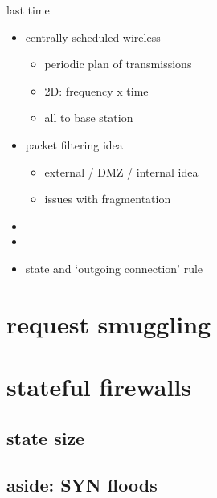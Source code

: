 \date{}
\title{}
\date{}

\begin{frame}
    \titlepage
\end{frame}

\begin{frame}{last time}
    \begin{itemize}
    \item centrally scheduled wireless
        \begin{itemize}
        \item periodic plan of transmissions
        \item 2D: frequency x time
        \item all to base station
        \end{itemize}
    \item packet filtering idea
        \begin{itemize}
        \item external / DMZ / internal idea
        \item issues with fragmentation
        \end{itemize}
    \item {}
    \item {}
    \item state and `outgoing connection' rule
    \end{itemize}
\end{frame}

\section{request smuggling}


\section{stateful firewalls}




\subsection{state size}


\subsection{aside: SYN floods}


